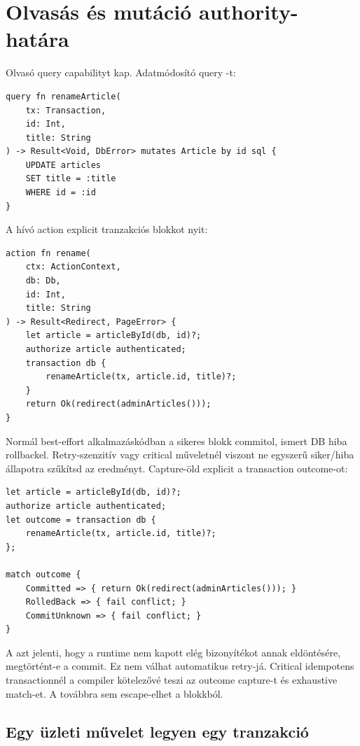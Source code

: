 \section{Olvasás és mutáció authority-határa}

Olvasó query  capabilityt kap. Adatmódosító query -t:

\begin{lstlisting}[language=RWLang]
query fn renameArticle(
    tx: Transaction,
    id: Int,
    title: String
) -> Result<Void, DbError> mutates Article by id sql {
    UPDATE articles
    SET title = :title
    WHERE id = :id
}
\end{lstlisting}

A hívó action explicit tranzakciós blokkot nyit:

\begin{lstlisting}[language=RWLang]
action fn rename(
    ctx: ActionContext,
    db: Db,
    id: Int,
    title: String
) -> Result<Redirect, PageError> {
    let article = articleById(db, id)?;
    authorize article authenticated;
    transaction db {
        renameArticle(tx, article.id, title)?;
    }
    return Ok(redirect(adminArticles()));
}
\end{lstlisting}

Normál best-effort alkalmazáskódban a sikeres blokk commitol, ismert DB hiba rollbackel. Retry-szenzitív vagy critical műveletnél viszont ne egyszerű siker/hiba állapotra szűkítsd az eredményt. Capture-öld explicit a transaction outcome-ot:

\begin{lstlisting}[language=RWLang]
let article = articleById(db, id)?;
authorize article authenticated;
let outcome = transaction db {
    renameArticle(tx, article.id, title)?;
};

match outcome {
    Committed => { return Ok(redirect(adminArticles())); }
    RolledBack => { fail conflict; }
    CommitUnknown => { fail conflict; }
}
\end{lstlisting}

A  azt jelenti, hogy a runtime nem kapott elég bizonyítékot annak eldöntésére, megtörtént-e a commit. Ez nem válhat automatikus retry-já. Critical idempotens transactionnél a compiler kötelezővé teszi az outcome capture-t és exhaustive match-et. A  továbbra sem escape-elhet a blokkból.

\subsection*{Egy üzleti művelet legyen egy tranzakció}

